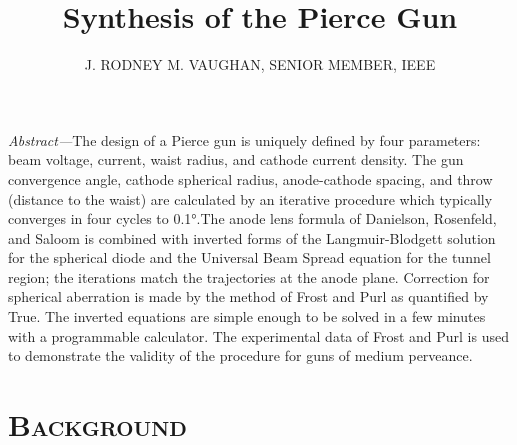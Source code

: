\documentclass[10pt,a4paper,UTF8,fleqn]{article}
\newcommand{\watermark}[3]{\AddToShipoutPictureBG{
		\parbox[b][\paperheight]{\paperwidth}{
			\vfill%
			\centering%
			\tikz[remember picture, overlay]%
			\node [rotate = #1, scale = #2] at (current page.center)%
			{\textcolor{gray!80!cyan!15}{#3}};
			\vfill}}}
\begin{document}
	\renewcommand{\thefootnote}{\roman{footnote}}
	\title{Synthesis of the Pierce Gun} 
	\date{}
	\author{\small J. RODNEY M. VAUGHAN, \footnotesize SENIOR MEMBER, IEEE}
	
	\renewcommand\thesection{\Roman{section}%
	}
\twocolumn[\maketitle]

\small \textit{Abstract---}The design of a Pierce gun is uniquely defined by four parameters: beam voltage, current, waist radius, and cathode current density. The gun convergence angle, cathode spherical radius, anode-cathode spacing, and throw (distance to the waist) are calculated by an iterative procedure which typically converges in four cycles to \ang{0.1}.The anode lens formula of Danielson, Rosenfeld, and Saloom is combined with inverted forms of the Langmuir-Blodgett solution for the spherical diode and the Universal Beam Spread equation for the tunnel region; the iterations match the trajectories at the anode plane. Correction for spherical aberration is made by the method of Frost and Purl as quantified by True. The inverted equations are simple enough to be solved in a few minutes with a programmable calculator. The experimental data of Frost and Purl is used to demonstrate the validity of the procedure for guns of medium perveance.



\normalsize
\section{\textsc{Background}}
\end{document}
